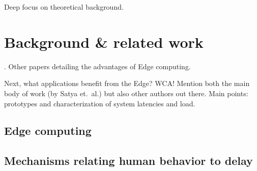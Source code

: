Deep focus on theoretical background.

\section{Background \& related work}
\textcite{Satya2009Case}.
Other papers detailing the advantages of Edge computing.

Next, what applications benefit from the Edge?
\gls{WCA}! Mention both the main body of work (by Satya et.\ al.) but also other authors out there.
Main points: prototypes and characterization of system latencies and load.

\subsection{Edge computing}
\subsection{}
\subsection{}
\subsection{Mechanisms relating human behavior to delay}
